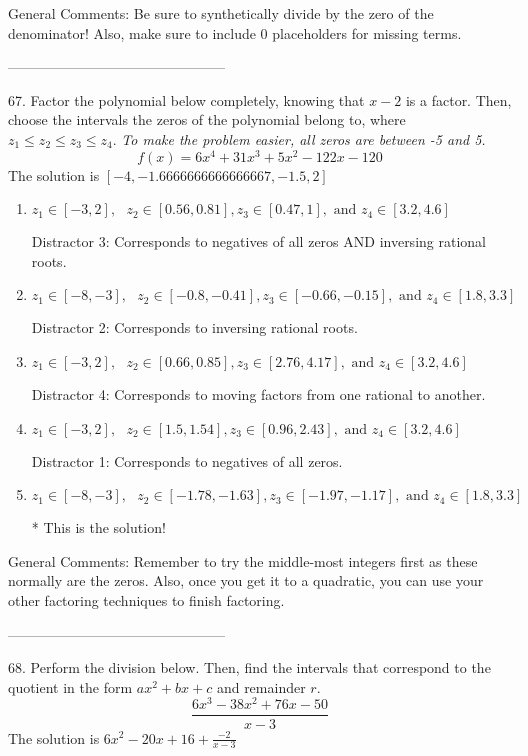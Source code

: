 \documentclass{extbook}[14pt]
\begin{document}
General Comments: Be sure to synthetically divide by the zero of the denominator! Also, make sure to include 0 placeholders for missing terms.

-----------------------------------------------

67. Factor the polynomial below completely, knowing that $x-2$ is a factor. Then, choose the intervals the zeros of the polynomial belong to, where $z_1 \leq z_2 \leq z_3 \leq z_4$. \textit{To make the problem easier, all zeros are between -5 and 5.}
\[ f(x) = 6x^{4} +31 x^{3} +5 x^{2} -122 x -120 \] 
The solution is $ [-4, -1.6666666666666667, -1.5, 2] $ 

\begin{enumerate}[label=\Alph*.] 
\item $ z_1 \in [-3, 2], \text{   }  z_2 \in [0.56, 0.81], z_3 \in [0.47, 1], \text{   and   } z_4 \in [3.2, 4.6] $ 

  Distractor 3: Corresponds to negatives of all zeros AND inversing rational roots. 
\item $ z_1 \in [-8, -3], \text{   }  z_2 \in [-0.8, -0.41], z_3 \in [-0.66, -0.15], \text{   and   } z_4 \in [1.8, 3.3] $ 

  Distractor 2: Corresponds to inversing rational roots. 
\item $ z_1 \in [-3, 2], \text{   }  z_2 \in [0.66, 0.85], z_3 \in [2.76, 4.17], \text{   and   } z_4 \in [3.2, 4.6] $ 

  Distractor 4: Corresponds to moving factors from one rational to another. 
\item $ z_1 \in [-3, 2], \text{   }  z_2 \in [1.5, 1.54], z_3 \in [0.96, 2.43], \text{   and   } z_4 \in [3.2, 4.6] $ 

  Distractor 1: Corresponds to negatives of all zeros. 
\item $ z_1 \in [-8, -3], \text{   }  z_2 \in [-1.78, -1.63], z_3 \in [-1.97, -1.17], \text{   and   } z_4 \in [1.8, 3.3] $ 

 * This is the solution! 
\end{enumerate} 
 
General Comments: Remember to try the middle-most integers first as these normally are the zeros. Also, once you get it to a quadratic, you can use your other factoring techniques to finish factoring.

-----------------------------------------------

68. Perform the division below. Then, find the intervals that correspond to the quotient in the form $ax^2+bx+c$ and remainder $r$.
\[ \frac{6x^{3} -38 x^{2} +76 x -50}{x -3} \] 
The solution is $ 6x^{2} -20 x + 16 + \frac{-2}{x -3} $ 
\end{document}
